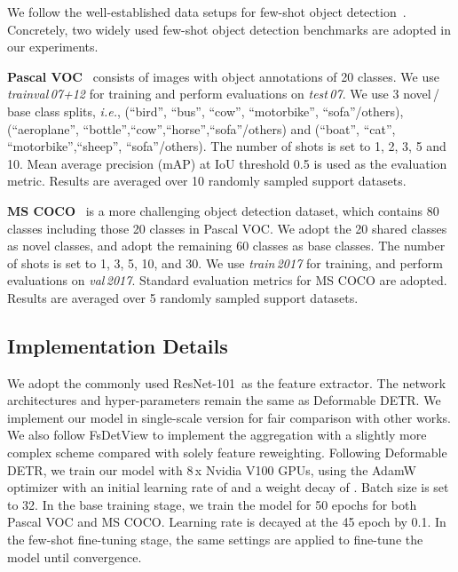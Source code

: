 \documentclass[letterpaper]{article} \usepackage{aaai22}  \usepackage{times}  \usepackage{helvet}  \usepackage{courier}  \usepackage[hyphens]{url}  \usepackage{graphicx} \urlstyle{rm} \def\UrlFont{\rm}  \usepackage{natbib}  \usepackage{caption} \DeclareCaptionStyle{ruled}{labelfont=normalfont,labelsep=colon,strut=off} \frenchspacing  \setlength{\pdfpagewidth}{8.5in}  \setlength{\pdfpageheight}{11in}  \usepackage{algorithm}
\begin{document}
We follow the well-established data setups for few-shot object detection~\cite{FewshotReweighting,fsdet}. Concretely, two widely used few-shot object detection benchmarks are adopted in our experiments.

\smallskip
\noindent
\textbf{Pascal VOC}~\cite{PascalVOC}
consists of images with object annotations of 20 classes. We use \textit{trainval\,07+12} for training and perform evaluations on \textit{test\,07}. We use 3 novel\,/\,base class splits, \textit{i.e.}, (“bird”, “bus”, “cow”, “motorbike”, “sofa”\;/\;others), (“aeroplane”, “bottle”,“cow”,“horse”,“sofa”\;/\;others) and (“boat”, “cat”, “motorbike”,“sheep”, “sofa”\;/\;others). The number of shots is set to 1, 2, 3, 5 and 10.  Mean average precision (mAP) at IoU threshold 0.5 is used as the evaluation metric. Results are averaged over 10 randomly sampled support datasets. 




\smallskip
\vspace{+0.15mm}
\noindent
\textbf{MS COCO}~\cite{MSCOCO}
is a more challenging object detection dataset, which contains 80 classes including those 20 classes in Pascal VOC. We adopt the 20 shared classes as novel classes, and adopt the remaining 60 classes as base classes. The number of shots is set to 1, 3, 5, 10, and 30. We use \textit{train\,2017} for training, and perform evaluations on \textit{val\,2017}. Standard evaluation metrics for MS COCO are adopted. Results are averaged over 5 randomly sampled support datasets.




\subsection{Implementation Details} \label{sec:imple_details}

We adopt the commonly used ResNet-101\,\cite{resnet} as the feature extractor. The network architectures and hyper-parameters remain the same as Deformable DETR\;\cite{DeformableDETR}. We implement our model in single-scale version for fair comparison with other works. We also follow FsDetView\;\cite{FSDetView} to implement the aggregation with a slightly more complex scheme compared with solely feature reweighting.
Following Deformable DETR, we train our model with 8\,x Nvidia V100 GPUs, using the AdamW\,\cite{AdamW} optimizer with an initial learning rate of  and a weight decay of . Batch size is set to 32. In the base training stage, we train the model for 50 epochs for both Pascal VOC and MS COCO. Learning rate is decayed at the 45 epoch by 0.1. In the few-shot fine-tuning stage, the same settings are applied to fine-tune the model until convergence.
\end{document}
